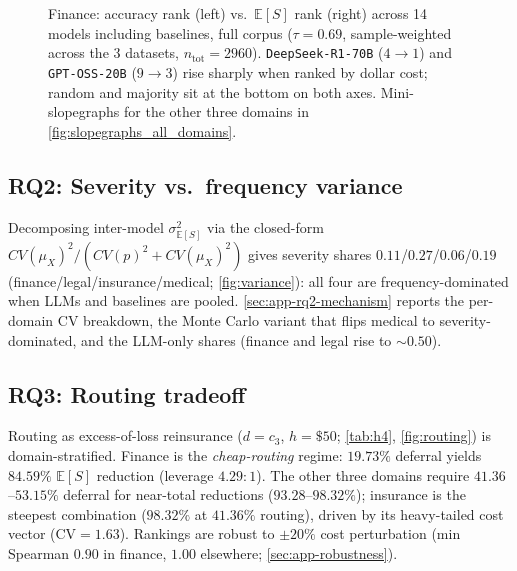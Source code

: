 \documentclass[11pt]{article}
\newcommand{\ES}{\mathbb{E}[S]}
\begin{document}
\begin{figure}[t]
{%
}%
\caption{Finance: accuracy rank (left) vs.\ $\widehat{\ES}$
rank (right) across 14 models including baselines, full corpus
($\tau{=}0.69$, sample-weighted across the 3 datasets,
$n_{\text{tot}}=2960$). \texttt{DeepSeek-R1-70B} ($4{\to}1$) and
\texttt{GPT-OSS-20B} ($9{\to}3$) rise sharply when ranked by dollar cost;
random and majority sit at the bottom on both axes. Mini-slopegraphs
for the other three domains in
\autoref{fig:slopegraphs_all_domains}.}
\label{fig:ranking_finance}
\vspace{-1em}
\end{figure}

\subsection{RQ2: Severity vs.\ frequency variance}
\label{sec:rq2}

Decomposing inter-model $\sigma^2_{\ES}$ via the closed-form
$CV(\mu_X)^2 / (CV(p)^2 + CV(\mu_X)^2)$ gives severity shares
$0.11$/$0.27$/$0.06$/$0.19$ (finance/legal/insurance/medical;
\autoref{fig:variance}): all four are frequency-dominated when
LLMs and baselines are pooled. \autoref{sec:app-rq2-mechanism}
reports the per-domain CV breakdown, the Monte Carlo variant
that flips medical to severity-dominated, and the LLM-only
shares (finance and legal rise to $\sim$$0.50$).

\subsection{RQ3: Routing tradeoff}
\label{sec:rq3}

Routing as excess-of-loss reinsurance ($d{=}c_3$, $h{=}\$50$;
\autoref{tab:h4}, \autoref{fig:routing}) is domain-stratified.
Finance is the \emph{cheap-routing} regime: $19.73\%$ deferral
yields $84.59\%$ $\ES$ reduction (leverage $4.29{:}1$). The
other three domains require $41.36$--$53.15\%$ deferral for
near-total reductions ($93.28$--$98.32\%$); insurance is the
steepest combination ($98.32\%$ at $41.36\%$ routing), driven by
its heavy-tailed cost vector ($\text{CV}{=}1.63$). Rankings are
robust to $\pm 20\%$ cost perturbation (min Spearman $0.90$ in
finance, $1.00$ elsewhere; \autoref{sec:app-robustness}).
\end{document}
